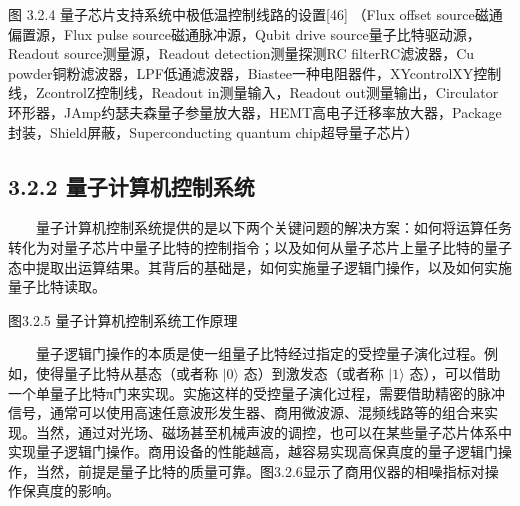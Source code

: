 \documentclass[a4paper,11pt,english]{sphinxmanual}
\begin{document}
\begin{center}图 3.2.4 量子芯片支持系统中极低温控制线路的设置{[}46{]} （Flux offset source\sphinxhyphen{}磁通偏置源，Flux pulse source\sphinxhyphen{}磁通脉冲源，Qubit drive source\sphinxhyphen{}量子比特驱动源，Readout source\sphinxhyphen{}测量源，Readout detection\sphinxhyphen{}测量探测RC filter\sphinxhyphen{}RC滤波器，Cu powder\sphinxhyphen{}铜粉滤波器，LPF\sphinxhyphen{}低通滤波器，Bias\sphinxhyphen{}tee\sphinxhyphen{}一种电阻器件，XY\sphinxhyphen{}control\sphinxhyphen{}XY控制线，Z\sphinxhyphen{}control\sphinxhyphen{}Z控制线，Readout in\sphinxhyphen{}测量输入，Readout out\sphinxhyphen{}测量输出，Circulator\sphinxhyphen{}环形器，J\sphinxhyphen{}Amp\sphinxhyphen{}约瑟夫森量子参量放大器，HEMT\sphinxhyphen{}高电子迁移率放大器，Package\sphinxhyphen{}封装，Shield\sphinxhyphen{}屏蔽，Superconducting quantum chip\sphinxhyphen{}超导量子芯片）
\end{center}

\subsection{3.2.2 量子计算机控制系统}
\label{\detokenize{rst/3.2_u91cf_u5b50_u8ba1_u7b97_u786c_u4ef6:id3}}
\sphinxAtStartPar
  量子计算机控制系统提供的是以下两个关键问题的解决方案：如何将运算任务转化为对量子芯片中量子比特的控制指令；以及如何从量子芯片上量子比特的量子态中提取出运算结果。其背后的基础是，如何实施量子逻辑门操作，以及如何实施量子比特读取。


\begin{center}图3.2.5 量子计算机控制系统工作原理
\end{center}
\sphinxAtStartPar
  量子逻辑门操作的本质是使一组量子比特经过指定的受控量子演化过程。例如，使得量子比特从基态（或者称 \(|0 \rangle\) 态）到激发态（或者称 \(|1 \rangle\) 态），可以借助一个单量子比特π门来实现。实施这样的受控量子演化过程，需要借助精密的脉冲信号，通常可以使用高速任意波形发生器、商用微波源、混频线路等的组合来实现。当然，通过对光场、磁场甚至机械声波的调控，也可以在某些量子芯片体系中实现量子逻辑门操作。商用设备的性能越高，越容易实现高保真度的量子逻辑门操作，当然，前提是量子比特的质量可靠。图3.2.6显示了商用仪器的相噪指标对操作保真度的影响。

\end{document}
